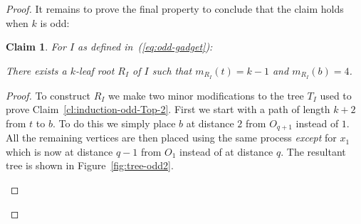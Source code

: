 \documentclass[11pt,letter]{article}
\newtheorem{claim}[theorem]{Claim}
\theoremstyle{remark}
\begin{document}
\begin{proof}
    It remains to prove the final property to conclude that the claim holds when $k$ is odd:
    
    \begin{claim}\label{cl:induction-odd-Bot}
        For $I$ as defined in~(\ref{eq:odd-gadget}):
        
        There exists a $k$-leaf root $R_I$ of $I$ such that $m_{R_I}(t)=k-1$ and $m_{R_I}(b)=4$.
    \end{claim}
    
    \begin{proof}
        To construct $R_I$ we make two minor modifications to the tree $T_I$ used to prove Claim~\ref{cl:induction-odd-Top-2}. First we start with a path of length $k+2$ from $t$ to $b$. To do this we simply place $b$ at distance $2$ from $O_{q+1}$ instead of $1$. All the remaining vertices are then placed using the same process {\em except} for $x_1$ which is now at distance $q-1$ from $O_1$ instead of at distance $q$. The resultant tree is shown in Figure~\ref{fig:tree-odd2}.
\begin{figure}[h!]
        \centering
{}
\end{figure}
\end{proof}
\end{proof}
\end{document}
